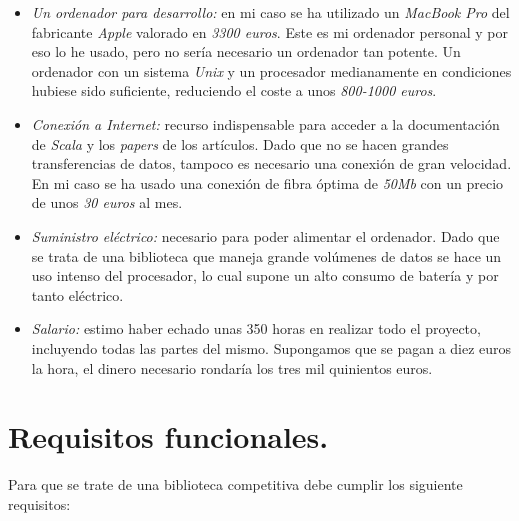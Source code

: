 \begin{itemize}
	\item \textit{Un ordenador para desarrollo:} en mi caso se ha utilizado un \textit{MacBook Pro} del fabricante \textit{Apple} valorado en \textit{3300 euros}. Este es mi ordenador personal y por eso lo he usado, pero no sería necesario un ordenador tan potente. Un ordenador con un sistema \textit{Unix} y un procesador medianamente en condiciones hubiese sido suficiente, reduciendo el coste a unos \textit{800-1000 euros}.
	\item \textit{Conexión a Internet:} recurso indispensable para acceder a la documentación de \textit{Scala} y los \textit{papers} de los artículos. Dado que no se hacen grandes transferencias de datos, tampoco es necesario una conexión de gran velocidad. En mi caso se ha usado una conexión de fibra óptima de \textit{50Mb} con un precio de unos \textit{30 euros} al mes.
	\item \textit{Suministro eléctrico:} necesario para poder alimentar el ordenador. Dado que se trata de una biblioteca que maneja grande volúmenes de datos se hace un uso intenso del procesador, lo cual supone un alto consumo de batería y por tanto eléctrico.
	\item \textit{Salario:} estimo haber echado unas 350 horas en realizar todo el proyecto, incluyendo todas las partes del mismo. Supongamos que se pagan a diez euros la hora, el dinero necesario rondaría los tres mil quinientos euros.
\end{itemize}

\section{Requisitos funcionales.} \label{sec:requisitos}

Para que se trate de una biblioteca competitiva debe cumplir los siguiente requisitos:

